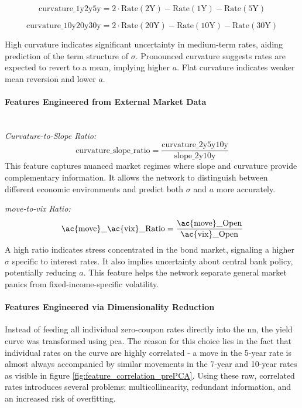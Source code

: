 \begin{equation}
	\text{curvature\_1y2y5y} = 2 \cdot \text{Rate}(2\text{Y}) - \text{Rate}(1\text{Y}) - \text{Rate}(5\text{Y})
\end{equation}

\begin{equation}
	\text{curvature\_10y20y30y} = 2 \cdot \text{Rate}(20\text{Y}) - \text{Rate}(10\text{Y}) - \text{Rate}(30\text{Y})
\end{equation}

High curvature indicates significant uncertainty in medium-term rates, aiding prediction of the term structure of \(\sigma\). Pronounced curvature suggests rates are expected to revert to a mean, implying higher \(a\). Flat curvature indicates weaker mean reversion and lower \(a\).

\paragraph{Features Engineered from External Market Data} \mbox{}\\
\textit{Curvature-to-Slope Ratio:}
\begin{equation}
	\text{curvature\_slope\_ratio} = \frac{\text{curvature\_2y5y10y}}{\text{slope\_2y10y}}
\end{equation}
This feature captures nuanced market regimes where slope and curvature provide complementary information. It allows the network to distinguish between different economic environments and predict both \(\sigma\) and \(a\) more accurately.

\textit{\ac{move}-to-\ac{vix} Ratio:}
\begin{equation}
	\text{\ac{move}\_\ac{vix}\_Ratio} = \frac{\text{\ac{move}\_Open}}{\text{\ac{vix}\_Open}}
\end{equation}
A high ratio indicates stress concentrated in the bond market, signaling a higher \(\sigma\) specific to interest rates. It also implies uncertainty about central bank policy, potentially reducing \(a\). This feature helps the network separate general market panics from fixed-income-specific volatility.

\paragraph{Features Engineered via Dimensionality Reduction}
Instead of feeding all individual zero-coupon rates directly into the \ac{nn}, the yield curve was transformed using \ac{pca}. The reason for this choice lies in the fact that individual rates on the curve are highly correlated - a move in the 5-year rate is almost always accompanied by similar movements in the 7-year and 10-year rates as visible in figure \ref{fig:feature_correlation_prePCA}. Using these raw, correlated rates introduces several problems: multicollinearity, redundant information, and an increased risk of overfitting.

